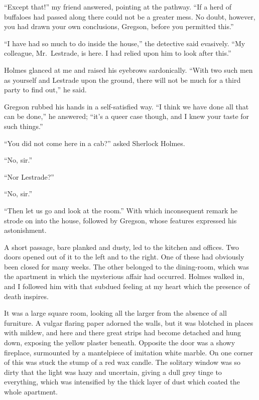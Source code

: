 \documentclass[12pt,english,oneside]{book}
\begin{document}
{}``Except that!'' my friend answered, pointing at the pathway.
{}``If a herd of buffaloes had passed along there could not be a
greater mess. No doubt, however, you had drawn your own conclusions,
Gregson, before you permitted this.''

{}``I have had so much to do inside the house,'' the detective said
evasively. {}``My colleague, Mr.\ Lestrade, is here. I had relied
upon him to look after this.''

Holmes glanced at me and raised his eyebrows sardonically. {}``With
two such men as yourself and Lestrade upon the ground, there will
not be much for a third party to find out,'' he said.

Gregson rubbed his hands in a self-satisfied way. {}``I think we
have done all that can be done,'' he answered; {}``it's a queer
case though, and I knew your taste for such things.''

{}``You did not come here in a cab?'' asked Sherlock Holmes.

{}``No, sir.''

{}``Nor Lestrade?''

{}``No, sir.''

{}``Then let us go and look at the room.'' With which inconsequent
remark he strode on into the house, followed by Gregson, whose features
expressed his astonishment.

A short passage, bare planked and dusty, led to the kitchen and offices.
Two doors opened out of it to the left and to the right. One of these
had obviously been closed for many weeks. The other belonged to the
dining-room, which was the apartment in which the mysterious affair
had occurred. Holmes walked in, and I followed him with that subdued
feeling at my heart which the presence of death inspires.

It was a large square room, looking all the larger from the absence
of all furniture. A vulgar flaring paper adorned the walls, but it
was blotched in places with mildew, and here and there great strips
had become detached and hung down, exposing the yellow plaster beneath.
Opposite the door was a showy fireplace, surmounted by a mantelpiece
of imitation white marble. On one corner of this was stuck the stump
of a red wax candle. The solitary window was so dirty that the light
was hazy and uncertain, giving a dull grey tinge to everything, which
was intensified by the thick layer of dust which coated the whole
apartment.
\end{document}

